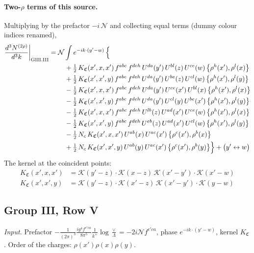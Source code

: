 \documentclass[10pt]{article}
\numberwithin{equation}{section}
\newcommand{\KK}{\mathcal K}
\newcommand{\NN}{\mathcal N}
\begin{document}
\paragraph{Two-$\rho$ terms of this source.} Multiplying by the prefactor $-i\,\NN$ and collecting equal terms (dummy colour indices renamed),
\begin{align}
\frac{d^3N^{(2\rho)}}{d^3k}\bigg|_{\rm GIII.III}={}&\NN\int e^{-ik\cdot(y'-w)}\,\Big\{\notag\\
&\quad +\tfrac12\,K_{\mathfrak C}(x',x,x')\,f^{abc}\,f^{deh}\,U^{da}(y')\,U^{bl}(z)\,U^{ce}(w)\,\big\{\rho^{h}(x'),\rho^{l}(x)\big\}\notag\\
&\quad +\tfrac12\,K_{\mathfrak C}(x',x',y)\,f^{abc}\,f^{deh}\,U^{da}(y')\,U^{be}(z)\,U^{cl}(w)\,\big\{\rho^{h}(x'),\rho^{l}(y)\big\}\notag\\
&\quad -\tfrac12\,K_{\mathfrak C}(x',x,x')\,f^{abc}\,f^{deh}\,U^{da}(y')\,U^{ce}(x')\,U^{bl}(x)\,\big\{\rho^{h}(x'),\rho^{l}(x)\big\}\notag\\
&\quad -\tfrac12\,K_{\mathfrak C}(x',x',y)\,f^{abc}\,f^{deh}\,U^{da}(y')\,U^{cl}(y)\,U^{be}(x')\,\big\{\rho^{h}(x'),\rho^{l}(y)\big\}\notag\\
&\quad -\tfrac12\,K_{\mathfrak C}(x',x,x')\,f^{abc}\,f^{deh}\,U^{lb}(z)\,U^{ad}(x')\,U^{ce}(w)\,\big\{\rho^{h}(x'),\rho^{l}(x)\big\}\notag\\
&\quad -\tfrac12\,K_{\mathfrak C}(x',x',y)\,f^{abc}\,f^{deh}\,U^{eb}(z)\,U^{ad}(x')\,U^{cl}(w)\,\big\{\rho^{h}(x'),\rho^{l}(y)\big\}\notag\\
&\quad -\tfrac12\,N_{c}\,K_{\mathfrak C}(x',x,x')\,U^{ab}(x)\,U^{ac}(x')\,\big\{\rho^{c}(x'),\rho^{b}(x)\big\}\notag\\
&\quad +\tfrac12\,N_{c}\,K_{\mathfrak C}(x',x',y)\,U^{ab}(y)\,U^{ac}(x')\,\big\{\rho^{c}(x'),\rho^{b}(y)\big\}\Big\}+\big(y'\leftrightarrow w\big)\label{R:eq:res-GIII.III}
\end{align}
The kernel at the coincident points:
\begin{align*}
K_{\mathfrak C}(x',x,x')&=\KK(y'-z)\cdot\KK(x-z)\,\KK(x'-y')\cdot\KK(x'-w)\\K_{\mathfrak C}(x',x',y)&=\KK(y'-z)\cdot\KK(x'-z)\,\KK(x'-y')\cdot\KK(y-w)
\end{align*}
\subsection{Group III, Row V}\label{R:sec:GIII.V}
\emph{Input.} Prefactor $-\frac{1}{(2\pi)^3}\frac{ig^4f^{c'ca}}{8\pi^5}\frac1{k^+}\log\frac\vee\Lambda=-2i\NN f^{c'ca}$, phase $e^{-ik\cdot(y'-w)}$, kernel $K_{\mathfrak C}$. Order of the charges: $\rho(x')\rho(x)\rho(y)$.
\end{document}
